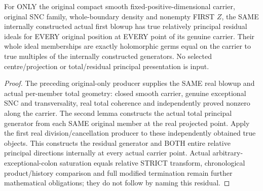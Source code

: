 \begin{theorem}
\label{hir:sharp-original-first-member-residual-actual-relative-principal}
\leanok
For ONLY the original compact smooth fixed-positive-dimensional carrier,
original SNC family, whole-boundary density and nonempty FIRST $Z$, the SAME
internally constructed actual first blowup has true relatively principal
residual ideals for EVERY original position at EVERY point of its genuine
carrier. Their whole ideal memberships are exactly holomorphic germs equal
on the carrier to true multiples of the internally constructed generators.
No selected centre/projection or total/residual principal presentation is input.
\end{theorem}
\begin{proof}
The preceding original-only producer supplies the SAME real blowup and actual
per-member total geometry: closed smooth carrier, genuine exceptional SNC and
transversality, real total coherence and independently proved nonzero along
the carrier. The second lemma constructs the actual total principal generator
from each SAME original member at the real projected point. Apply the first
real division/cancellation producer to these independently obtained true
objects. This constructs the residual generator and BOTH entire relative
principal directions internally at every actual carrier point. Actual
arbitrary-exceptional-colon saturation equals relative STRICT transform,
chronological product/history comparison and full modified termination remain
further mathematical obligations; they do not follow by naming this residual.
\end{proof}
